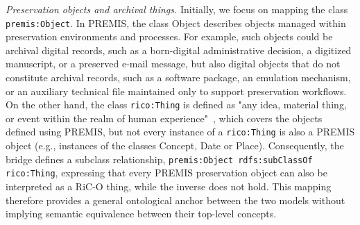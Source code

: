 \documentclass[runningheads]{llncs}
\begin{document}
	\emph{Preservation objects and archival things.} Initially, we focus on mapping the class \texttt{premis:Object}. In PREMIS, the class Object describes objects managed within preservation environments and processes. For example, such objects could be archival digital records, such as a born-digital administrative decision, a digitized manuscript, or a preserved e-mail message, but also digital objects that do not constitute archival records, such as a software package, an emulation mechanism, or an auxiliary technical file maintained only to support preservation workflows. On the other hand, the class \texttt{rico:Thing} is defined as "any idea, material thing, or event within the realm of human experience"~\cite{RICCM}, which covers the objects defined using PREMIS, but not every instance of a \texttt{rico:Thing} is also a PREMIS object (e.g., instances of the classes Concept, Date or Place). Consequently, the bridge defines a subclass relationship, \texttt{premis:Object rdfs:subClassOf rico:Thing}, expressing that every PREMIS preservation object can also be interpreted as a RiC-O thing, while the inverse does not hold. This mapping therefore provides a general ontological anchor between the two models without implying semantic equivalence between their top-level concepts.
	
	
	
	
\end{document}
